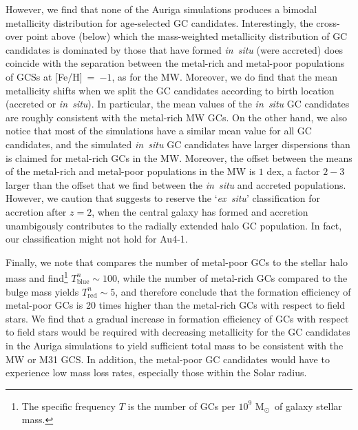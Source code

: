 \documentclass[a4paper,fleqn,usenatbib]{mnras}
\newcommand{\Sun}[0]{\ensuremath{_{\odot}}}
\begin{document}
However, we find that none of the Auriga simulations produces a bimodal 
metallicity distribution for age-selected GC candidates. Interestingly, the 
cross-over point above (below) which the mass-weighted metallicity distribution
of GC candidates is dominated by those that have formed {\it in~situ} (were
accreted) does coincide with the separation between the metal-rich and metal-poor
populations of GCSs at [Fe/H]~=~$-1$, as for the MW. Moreover, we do find 
that the mean metallicity shifts when we split the GC candidates according 
to birth location (accreted or {\it in~situ}). In particular, the mean values of 
the {\it in~situ} GC candidates are roughly consistent with the metal-rich MW GCs.
On the other hand, we also notice that most of the simulations have a similar 
mean value for all GC candidates, and the simulated {\it in~situ} GC candidates 
have larger dispersions than is claimed for metal-rich GCs in the MW. Moreover, the 
offset between the means of the metal-rich and metal-poor populations in the MW is
$1$ dex, a factor $2-3$ larger than the offset that we find between the {\it in~situ}
and accreted populations. However, we caution that \citet{2019MNRAS.486.3134K} suggests 
to reserve the `{\it ex~situ}' classification for accretion after $z=2$, when
the central galaxy has formed and accretion unambigously contributes to the
radially extended halo GC population. In fact, our classification might not hold for Au4-1.

Finally, we note that \citet{2006ARA&A..44..193B} compares the number of metal-poor 
GCs to the stellar halo mass and find\footnote{The specific frequency $T$ is 
the number of GCs per $10^9$ M\Sun \, of galaxy stellar mass.} $T^n_{\text{blue}} \sim 100$, 
while the number of metal-rich GCs compared to the bulge mass yields 
$T^n_{\text{red}} \sim 5$, and therefore conclude that the formation efficiency
of metal-poor GCs is 20 times higher than the metal-rich GCs with respect to 
field stars. We find that a gradual increase in formation efficiency of GCs
with respect to field stars would be required with decreasing metallicity for
the GC candidates in the Auriga simulations to yield sufficient total mass to
be consistent with the MW or M31 GCS. In addition, the metal-poor GC candidates
would have to experience low mass loss rates, especially those within the Solar
radius.
\end{document}
